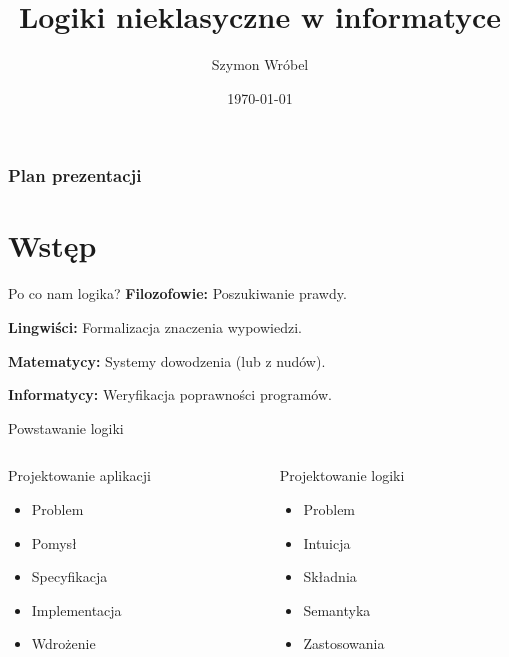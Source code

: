 \documentclass{beamer}
\title[Logiki nieklasyczne]{Logiki nieklasyczne w informatyce}
\author{Szymon Wróbel}
\date{\today}
\begin{document}
\begin{frame}
\titlepage
\end{frame}

\begin{frame}
\frametitle{Plan prezentacji}
\tableofcontents
\end{frame}


\section{Wstęp}
\begin{frame}{Po co nam logika?}
  \pause \textbf{Filozofowie:} Poszukiwanie prawdy.

  \pause \textbf{Lingwiści:} Formalizacja znaczenia wypowiedzi.

  \pause \textbf{Matematycy:} Systemy dowodzenia \pause (lub z nudów).

  \pause \textbf{Informatycy:} Weryfikacja poprawności programów.
\end{frame}

\begin{frame}{Powstawanie logiki}
  \begin{columns}
    \begin{column}{0.5\textwidth}
      Projektowanie aplikacji

      \begin{itemize}[<+->]
        \item Problem
        \item Pomysł
        \item Specyfikacja
        \item Implementacja
        \item Wdrożenie
      \end{itemize}
    \end{column}

    \pause

    \begin{column}{0.5\textwidth}
      Projektowanie logiki
      \begin{itemize}[<+->]
        \item Problem
        \item Intuicja
        \item Składnia
        \item Semantyka
        \item Zastosowania
      \end{itemize}
    \end{column}
  \end{columns}
\end{frame}
\end{document}

